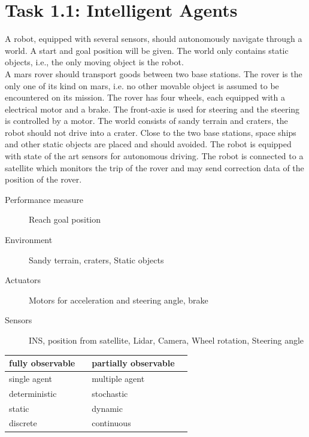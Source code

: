 \documentclass[a4paper,footsepline]{scrartcl}
\begin{document}
	\section*{Task 1.1: Intelligent Agents}
	A robot, equipped with several sensors, should autonomously navigate through a world. A
	start and goal position will be given. The world only contains static objects, i.e., the only
	moving object is the robot.\\
	A mars rover should transport goods between two base stations. The rover is the only one of its kind on mars, i.e. no other movable object is assumed to be encountered on its mission.  The rover has four wheels, each equipped with a electrical motor and a brake.
	The front-axie is used for steering and the steering is controlled by a motor. The world consists of sandy  terrain and craters, the robot should not drive into a crater. Close to the two base stations, space ships and other static objects are placed and should avoided. The robot is equipped with state of the art sensors for autonomous driving. The robot is connected to a satellite which monitors the trip of the rover and may send correction data of the position of the rover.
	\begin{description}
		\item[Performance measure]
		Reach goal position
		\item[Environment]
		Sandy terrain, craters, Static objects
		\item[Actuators]
		Motors for acceleration and steering angle, brake
		\item[Sensors]
		INS, position from satellite, Lidar, Camera, Wheel rotation, Steering angle
	\end{description}
	\vspace{0.3cm}
	\begin{tabular}{|lr|lr|}\hline
		fully observable & \Square & partially observable & \CheckedBox \\\hline
		single agent & \CheckedBox & multiple agent & \Square \\\hline
		deterministic & \Square & stochastic & \CheckedBox \\\hline
		static  & \CheckedBox & dynamic & \Square \\\hline
		discrete & \Square & continuous & \CheckedBox \\\hline
	\end{tabular}
\end{document}
